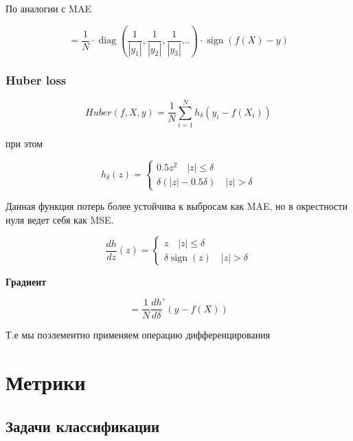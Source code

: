 \documentclass{article}
\begin{document}
    \quad  

    По аналогии с MAE 

    \begin{equation}
        [D_{f(X)}(MAPE)] =  \frac{1}{N} \cdot \operatorname{diag}(\frac{1}{| y_{1} |}, \frac{1}{| y_{2} |}, \frac{1}{| y_{3} |} ...) \cdot  \operatorname{sign}(f(X) - y)
    \end{equation}


    \subsubsection{Huber loss}

    \begin{equation}
        Huber(f, X, y) = \frac{1}{N} \sum_{i = 1}^{N} h_{\delta}(y_{i} - f(X_{i}))
    \end{equation}

    при этом 

    \[h_{\delta}(z)=
    \begin{cases}
        0.5 z^2  \quad | z | \leq \delta \\
        \delta (|z| - 0.5 \delta) \quad | z | > \delta
    \end{cases}
    \]

    Данная функция потерь более устойчива к выбросам как MAE, но в окрестности нуля ведет себя как MSE. 

    \[\frac{dh}{dz}(z) =
    \begin{cases}
        z  \quad | z | \leq \delta \\
        \delta \operatorname{sign}(z) \quad | z | > \delta
    \end{cases}
    \]

    \quad 

    \textbf{Градиент}

    \quad

    \begin{equation}
        [D_{f(X)}(Huber)] = \frac{1}{N} \frac{dh}{d\delta}^{\circ}(y - f(X))
    \end{equation}

    Т.е мы поэлементно применяем операцию дифференцирования


    \section{Метрики}

    \subsection{Задачи классификации}
\end{document}
